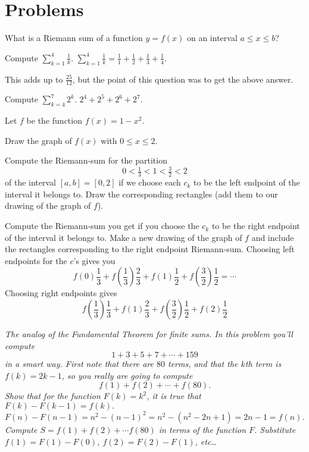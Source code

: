 \section{Problems} %
\problemfont %
\begin{multicols}{2}\setlength{\parindent}{0pt}
\problem  %
\subprob What is a Riemann sum of a function $y=f(x)$ on an interval $a\leq
x \leq b$?

\subprob Compute $\sum_{k=1}^4 \frac{1}{k}$.
\answer %
$\sum_{k=1}^4 \frac{1}{k}
= \frac{1}{1} +  \frac{1}{2} + \frac{1}{3} + \frac{1}{4}$.

This adds up to $\frac{25}{12}$, but the point of this question was to get the
above answer.
\endanswer

\subprob Compute $\sum_{k=4}^7 2^k$.
\answer %
$2^4 + 2^5 +2^6 + 2^7$.
\endanswer

\problem Let $f$ be the function $f(x) = 1-x^2$. %

\subprob Draw the graph of $f(x)$ with $0\le x\le2$.

\subprob Compute the Riemann-sum for the partition
\[
0<\tfrac13<1<\tfrac32<2
\]
of the interval $[a, b] = [0, 2]$ if we choose each $c_k$ to be the
left endpoint of the interval it belongs to.  Draw the corresponding
rectangles (add them to our drawing of the graph of $f$).

\subprob Compute the Riemann-sum you
get if you choose the $c_k$ to be the
right endpoint of the interval it belongs to.  Make a new drawing of
the graph of $f$ and include the rectangles corresponding to the right
endpoint Riemann-sum.
\answer %
Choosing left endpoints for the $c$'s gives you
\[
f(0)\frac13 + f(\frac13)\frac23 + f(1)\frac12 + f(\frac32)\frac12
=\cdots
\]
Choosing right endpoints gives
\[
f(\frac13)\frac13 + f(1)\frac23 + f(\frac32)\frac12 + f(2)\frac12
\]
\endanswer

\problem \itshape The analog of the Fundamental Theorem for finite sums.\upshape %
In this problem you'll compute 
\[
  1+3+5+7+\cdots+159
\]
in a smart way.  First note that there are $80$ terms, and that the $k$th term
is $f(k) = 2k-1$, so you really are going to compute
\[
  f(1) + f(2) + \cdots + f(80).
\]
\subprob Show that for the function $F(k) = k^2$, it is true that $F(k)-F(k-1) =
f(k).$
\answer %
$F(n) - F(n-1) = n^2 - (n-1)^2 = n^2 - (n^2-2n+1) = 2n-1 = f(n)$.
\endanswer
\subprob Compute $S = f(1)+f(2)+\cdots f(80)$ in terms of the function
$F$.  
\answer %
Substitute $f(1) = F(1) - F(0)$, $f(2) = F(2) - F(1)$, etc\ldots 


\end{multicols}
